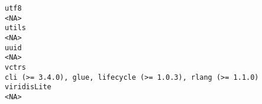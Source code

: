 \documentclass[
  letterpaper,
  DIV=11,
  numbers=noendperiod]{scrreprt}
\begin{document}
\begin{verbatim}
utf8                                                                                                                                                                                                                                                                                                                                                                                                                                                                                                                                                                                                                  <NA>
utils                                                                                                                                                                                                                                                                                                                                                                                                                                                                                                                                                                                                                 <NA>
uuid                                                                                                                                                                                                                                                                                                                                                                                                                                                                                                                                                                                                                  <NA>
vctrs                                                                                                                                                                                                                                                                                                                                                                                                                                                                                                                                                         cli (>= 3.4.0), glue, lifecycle (>= 1.0.3), rlang (>= 1.1.0)
viridisLite                                                                                                                                                                                                                                                                                                                                                                                                                                                                                                                                                                                                           <NA>

\end{verbatim}
\end{document}
